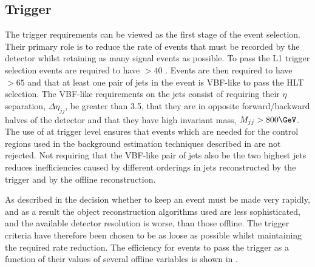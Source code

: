 \subsection{Trigger}
The trigger requirements can be viewed as the first stage of the event selection. Their primary role is to reduce the rate of events that must be recorded by the detector whilst retaining as many signal events as possible. To pass the \ac{L1} trigger selection events are required to have \MET$>40$ \GeV. Events are then required to have \METnoMU$>65$ \GeV and that at least one pair of jets in the event is \ac{VBF}-like to pass the \ac{HLT} selection. The \ac{VBF}-like requirements on the jets consist of requiring their $\eta$ separation, $\Delta\eta_{jj}$, be greater than 3.5, that they are in opposite forward/backward halves of the detector and that they have high invariant mass, $M_{jj}>800 \GeV$. The use of \METnoMU at trigger level ensures that events which are needed for the control regions used in the background estimation techniques described in  are not rejected. Not requiring that the \ac{VBF}-like pair of jets also be the two highest \pt jets reduces inefficiencies caused by different \pt orderings in jets reconstructed by the trigger and by the offline reconstruction. 

As described in  the decision whether to keep an event must be made very rapidly, and as a result the object reconstruction algorithms used are less sophisticated, and the available detector resolution is worse, than those offline. The trigger criteria have therefore been chosen to be as loose as possible whilst maintaining the required rate reduction. The efficiency for events to pass the trigger as a function of their values of several offline variables is shown in .


